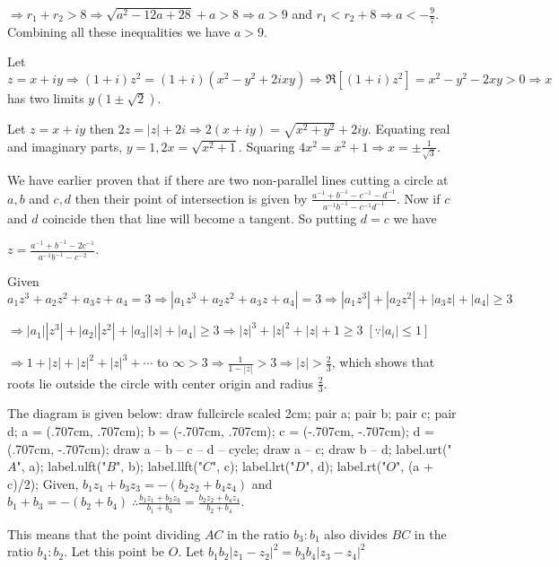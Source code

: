   $\Rightarrow r_1 + r_2 > 8 \Rightarrow \sqrt{a^2 - 12a + 28} + a > 8 \Rightarrow a > 9$ and $r_1 < r_2 + 8
  \Rightarrow a < -\frac{9}{7}$. Combining all these inequalities we have $a > 9$.
\item Let $z = x + iy \Rightarrow (1 + i)z^2 = (1 + i)(x^2 - y^2 + 2ixy)\Rightarrow \Re[(1 + i)z^2] = x^2 -
  y^2 - 2xy > 0 \Rightarrow x$ has two limits $y(1 \pm\sqrt{2})$.
\item Let $z = x + iy$ then $2z = |z| + 2i \Rightarrow 2(x + iy) = \sqrt{x^2 + y^2} + 2iy$. Equating real
  and imaginary parts, $y = 1, 2x = \sqrt{x^2 + 1}$. Squaring $4x^2 = x^2 + 1 \Rightarrow x =
  \pm\frac{1}{\sqrt{3}}$.
\item We have earlier proven that if there are two non-parallel lines cutting a circle at $a, b$ and $c, d$
  then their point of intersection is given by $\frac{a^{-1} + b^{-1} - c^{-1} - d^{-1}}{a^{-1}b^{-1}-
    c^{-1}d^{-1}}$. Now if $c$ and $d$ coincide then that line will become a tangent. So putting $d = c$ we
  have

  $z = \frac{a^{-1} + b^{-1} - 2c^{-1}}{a^{-1}b^{-1} - c^{-2}}$.
\item Given $a_1z^3 + a_2z^2 + a_3z + a_4 = 3 \Rightarrow |a_1z^3 + a_2z^2 + a_3z + a_4| = 3 \Rightarrow
  |a_1z^3| + |a_2z^2| + |a_3z| + |a_4| \geq 3$

  $\Rightarrow |a_1||z^3| + |a_2||z^2| + |a_3||z| + |a_4|\geq 3 \Rightarrow |z|^3 + |z|^2 + |z| + 1\geq
  3\;[\because |a_i|\leq 1]$

  $\Rightarrow 1 + |z| + |z|^2 + |z|^3 + \cdots $ to $\infty > 3 \Rightarrow \frac{1}{1 - |z|} > 3
  \Rightarrow |z| > \frac{2}{3}$, which shows that roots lie outside the circle with center origin and
  radius $\frac{2}{3}$.
\item The diagram is given below:
  \startplacefigure[location={left, none}]
    \startMPcode
      draw fullcircle scaled 2cm;
      pair a; pair b; pair c; pair d;
      a = (.707cm, .707cm); b = (-.707cm, .707cm); c = (-.707cm, -.707cm); d = (.707cm, -.707cm);
      draw a -- b -- c -- d -- cycle;
      draw a -- c; draw b -- d;
      label.urt("$A$", a);
      label.ulft("$B$", b);
      label.llft("$C$", c);
      label.lrt("$D$", d);
      label.rt("$O$", (a + c)/2);
    \stopMPcode
  \stopplacefigure
  Given, $b_1z_1 + b_3z_3 = -(b_2z_2 + b_4z_4)$ and $b_1 + b_3 = -(b_2 + b_4)\;\therefore \frac{b_1z_1 +
    b_3z_3}{b_1 + b_3} = \frac{b_2z_2 + b_4z_4}{b_2 + b_4}$.

  This means that the point dividing $AC$ in the ratio $b_3:b_1$ also divides $BC$ in the ratio
  $b_4:b_2$. Let this point be $O$. Let $b_1b_2|z_1 - z_2|^2 = b_3b_4|z_3 - z_4|^2$

